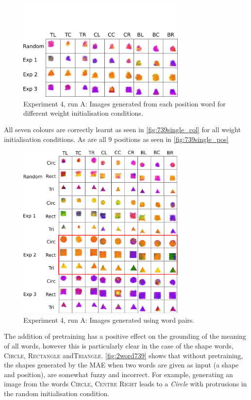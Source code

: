 \begin{figure}[h]
\centering
\includegraphics[width=0.75\textwidth]{Figs/shapes/singlelabel739_pos.png}
\caption{Experiment 4, run A: Images generated from each position word for different weight initialisation conditions.}
\label{fig:739single_pos}
\end{figure}

All seven colours are correctly learnt as seen in \autoref{fig:739single_col} for all weight initialisation conditions. As are all 9 positions as seen in \autoref{fig:739single_pos}




\begin{figure}[h!]
\centering
\includegraphics[width=0.75\textwidth]{Figs/shapes/2word739_pos.png}
\caption{Experiment 4, run A: Images generated using word pairs.}
\label{fig:2word739}
\end{figure}

The addition of pretraining has a positive effect on the grounding of the meaning of all words, however this is particularly clear in the case of the shape words, \textsc{Circle}, \textsc{Rectangle} and\textsc{Triangle}. \autoref{fig:2word739} shows that without pretraining, the shapes generated by the MAE when two words are given as input (a shape and position), are somewhat fuzzy and incorrect. For example, generating an image from the words \textsc{Circle, Centre Right} leads to a \textit{Circle} with protrusions in the random initialisation condition.

